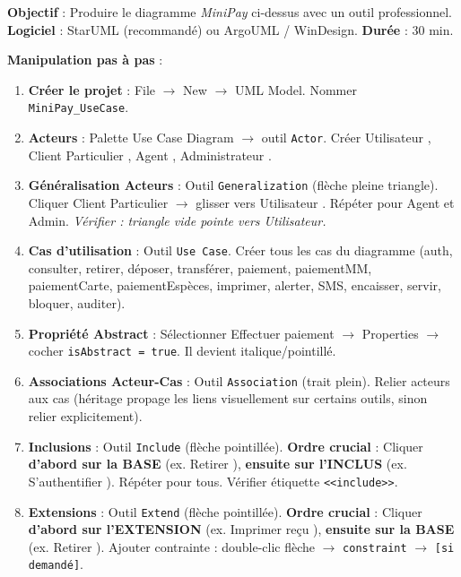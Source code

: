 \documentclass[11pt]{article}
\begin{document}
\begin{experience}
\textbf{Objectif} : Produire le diagramme \emph{MiniPay} ci-dessus avec un outil professionnel.
\textbf{Logiciel} : StarUML (recommandé) ou ArgoUML / WinDesign.
\textbf{Durée} : 30 min.

\textbf{Manipulation pas à pas} :
\begin{enumerate}
    \item \textbf{Créer le projet} : File $\rightarrow$ New $\rightarrow$ UML Model. Nommer \texttt{MiniPay\_UseCase}.
    \item \textbf{Acteurs} : Palette \guillemotleft Use Case Diagram \guillemotright $\rightarrow$ outil \texttt{Actor}. Créer \guillemotleft Utilisateur \guillemotright, \guillemotleft Client Particulier \guillemotright, \guillemotleft Agent \guillemotright, \guillemotleft Administrateur \guillemotright.
    \item \textbf{Généralisation Acteurs} : Outil \texttt{Generalization} (flèche pleine triangle). Cliquer \guillemotleft Client Particulier \guillemotright $\rightarrow$ glisser vers \guillemotleft Utilisateur \guillemotright. Répéter pour Agent et Admin. \textit{Vérifier : triangle vide pointe vers Utilisateur.}
    \item \textbf{Cas d'utilisation} : Outil \texttt{Use Case}. Créer tous les cas du diagramme (auth, consulter, retirer, déposer, transférer, paiement, paiementMM, paiementCarte, paiementEspèces, imprimer, alerter, SMS, encaisser, servir, bloquer, auditer).
    \item \textbf{Propriété Abstract} : Sélectionner \guillemotleft Effectuer paiement \guillemotright $\rightarrow$ Properties $\rightarrow$ cocher \texttt{isAbstract = true}. Il devient italique/pointillé.
    \item \textbf{Associations Acteur-Cas} : Outil \texttt{Association} (trait plein). Relier acteurs aux cas (héritage propage les liens visuellement sur certains outils, sinon relier explicitement).
    \item \textbf{Inclusions} : Outil \texttt{Include} (flèche pointillée). \textbf{Ordre crucial} : Cliquer \textbf{d'abord sur la BASE} (ex. \guillemotleft Retirer \guillemotright), \textbf{ensuite sur l'INCLUS} (ex. \guillemotleft S'authentifier \guillemotright). Répéter pour tous. Vérifier étiquette \texttt{<<include>>}.
    \item \textbf{Extensions} : Outil \texttt{Extend} (flèche pointillée). \textbf{Ordre crucial} : Cliquer \textbf{d'abord sur l'EXTENSION} (ex. \guillemotleft Imprimer reçu \guillemotright), \textbf{ensuite sur la BASE} (ex. \guillemotleft Retirer \guillemotright). Ajouter contrainte : double-clic flèche $\rightarrow$ \texttt{constraint} $\rightarrow$ \texttt{[si demandé]}.

\end{enumerate}
\end{experience}
\end{document}
